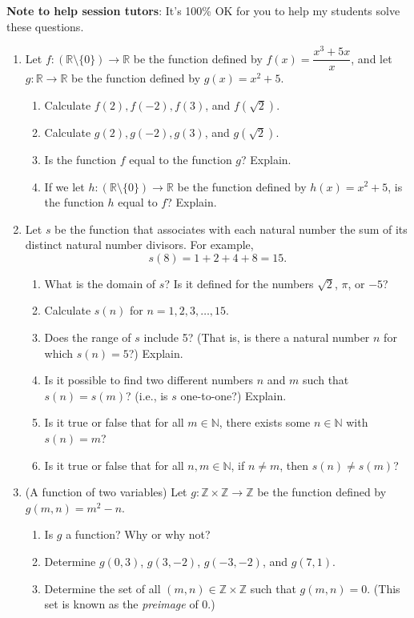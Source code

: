 \documentclass[letterpaper,12pt]{article}
\newcommand{\N}{\mathbb{N}}
\newcommand{\Z}{\mathbb{Z}}
\newcommand{\R}{\mathbb{R}}
\begin{document}
{\bf Note to help session tutors}: It's 100\% OK for you to help my students solve these questions.
\begin{enumerate}
\item Let $f:(\R\setminus\{0\})\to \R$ be the function defined by $f(x)=\dfrac{x^3+5x}{x}$, and let $g:\R\to\R$ be the function defined by $g(x)=x^2+5$.
\begin{enumerate}
 \item Calculate $f(2), f(-2), f(3)$, and $f(\sqrt{2})$.
 \item Calculate $g(2), g(-2), g(3)$, and $g(\sqrt{2})$.
 \item Is the function $f$ equal to the function $g$? Explain.
 \item If we let $h:(\R\setminus \{0\})\to \R$ be the function defined by $h(x)=x^2+5$, is the function $h$ equal to $f$? Explain.
\end{enumerate}
\item Let $s$ be the function that associates with each natural number the sum of its distinct natural number divisors. For example, 
\[
 s(8) = 1+2+4+8 = 15.
\]
\begin{enumerate}
 \item What is the domain of $s$? Is it defined for the numbers $\sqrt{2}$, $\pi$, or $-5$?
 \item Calculate $s(n)$ for $n=1,2,3,\ldots, 15$.
 \item Does the range of $s$ include 5? (That is, is there a natural number $n$ for which $s(n)=5$?) Explain.
 \item Is it possible to find two different numbers $n$ and $m$ such that $s(n)=s(m)$? (i.e., is $s$ one-to-one?) Explain.
 \item Is it true or false that for all $m\in\N$, there exists some $n\in\N$ with $s(n)=m$?
 \item Is it true or false that for all $n,m\in\N$, if $n\neq m$, then $s(n)\neq s(m)$?
\end{enumerate}
\item (A function of two variables) Let $g:\Z\times\Z\to \Z$ be the function defined by $g(m,n) = m^2-n$.
\begin{enumerate}
 \item Is $g$ a function? Why or why not?
 \item Determine $g(0,3)$, $g(3,-2)$, $g(-3, -2)$, and $g(7,1)$.
 \item Determine the set of all $(m,n)\in\Z\times \Z$ such that $g(m,n)=0$. (This set is known as the {\em preimage} of 0.)
\end{enumerate}

\end{enumerate}
\end{document}
